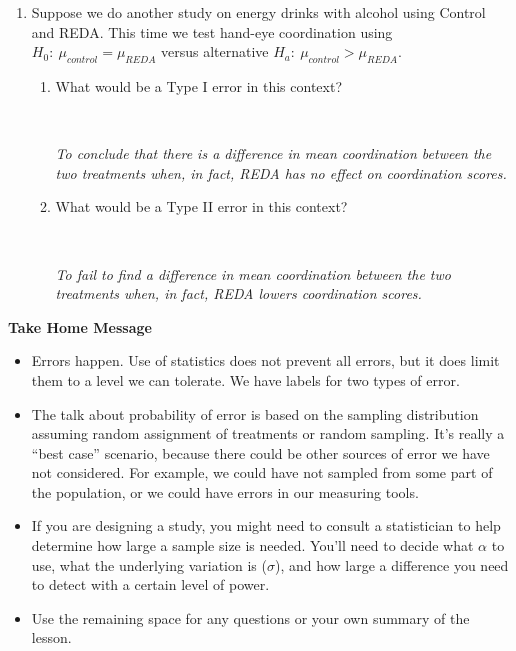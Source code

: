 \begin{enumerate}
\begin{key}
  {\it  Type II = 1--power so we want more than 90\% power.  Need 43
      people. }
\end{key}
\item Suppose we do another study on energy drinks with alcohol using
  Control and REDA.  This time we test hand-eye coordination using
  $H_0:\ \mu_{control} = \mu_{REDA}$ versus alternative  $H_a:\
  \mu_{control} > \mu_{REDA}$.
  \begin{enumerate}
  \item What would be a Type I error in this context? 
\begin{students}
 \vspace{1cm}\\
\end{students}

\begin{key}
  {\it   To conclude that there is a difference in mean coordination between the
    two treatments when, in fact, REDA has no effect on coordination scores. }
\end{key}
  \item What would be a Type II error in this context? 
\begin{students}
 \vspace{1cm}\\
\end{students}

\begin{key}
  {\it  To fail to find a difference in mean coordination between the
    two treatments when, in fact, REDA lowers coordination scores. }
\end{key}
  \end{enumerate}

\end{enumerate}


\begin{center}
  {\bf Take Home Message} \vspace{-.6cm}
\end{center}
\begin{itemize}
  \item Errors happen.  Use of statistics does not prevent all errors,
    but it does limit them to a level we can tolerate. We have labels
    for two types of error.
  \item The talk about probability of  error is based on the sampling
    distribution assuming random assignment of treatments or random
    sampling. It's really a ``best case'' scenario, because there
    could be other sources of error we have not considered.  For
    example, we could have not sampled from some part of the
    population, or we could have errors in our measuring tools.
  \item If you are designing a study, you might need to consult a
    statistician to help determine how large a sample size is
    needed. You'll need to decide what $\alpha$ to use, what the
    underlying variation is ($\sigma$), and how large a difference you
    need to detect with a certain level of power.
 \item 
  Use the remaining space for any questions or your own summary of the
  lesson. 
\end{itemize}
